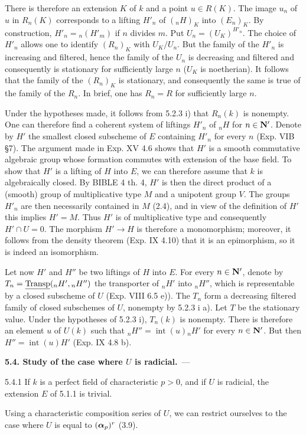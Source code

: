 There is therefore an extension $K$ of $k$ and a point $u\in R(K)$. The image $u_n$ of $u$ in $R_n(K)$ corresponds to a lifting $H'_n$ of $({}_nH)_K$ into $(E_n)_K$. By construction, $H'_n={}_n(H'_m)$ if $n$ divides $m$. Put $U_n=(U_K)^{H'_n}$. The choice of $H'_n$ allows one to identify $(R_n)_K$ with $U_K/U_n$. But the family of the $H'_n$ is increasing and filtered, hence the family of the $U_n$ is decreasing and filtered and consequently is stationary for sufficiently large $n$ ($U_K$ is noetherian). It follows that the family of the $(R_n)_K$ is stationary, and consequently the same is true of the family of the $R_n$. In brief, one has $R_n=R$ for sufficiently large $n$.

Under the hypotheses made, it follows from 5.2.3 i) that $R_n(k)$ is nonempty. One can therefore find a coherent system of liftings $H'_n$ of ${}_nH$ for $n\in\mathbf{N}'$. Denote by $H'$ the smallest closed subscheme of $E$ containing $H'_n$ for every $n$ (Exp. VIB \S7). The argument made in Exp. XV 4.6 shows that $H'$ is a smooth commutative algebraic group whose formation commutes with extension of the base field. To show that $H'$ is a lifting of $H$ into $E$, we can therefore assume that $k$ is algebraically closed. By BIBLE 4 th. 4, $H'$ is then the direct product of a (smooth) group of multiplicative type $M$ and a unipotent group $V$. The groups $H'_n$ are then necessarily contained in $M$ (2.4), and in view of the definition of $H'$ this implies $H'=M$. Thus $H'$ is of multiplicative type and consequently $H'\cap U=0$. The morphism $H'\to H$ is therefore a monomorphism; moreover, it follows from the density theorem (Exp. IX 4.10) that it is an epimorphism, so it is indeed an isomorphism.

Let now $H'$ and $H''$ be two liftings of $H$ into $E$. For every $n\in\mathbf{N}'$, denote by $T_n=\underline{\operatorname{Transp}}({}_nH',{}_nH'')$ the transporter of ${}_nH'$ into ${}_nH''$, which is representable by a closed subscheme of $U$ (Exp. VIII 6.5 e)). The $T_n$ form a decreasing filtered family of closed subschemes of $U$, nonempty by 5.2.3 i a). Let $T$ be the stationary value. Under the hypotheses of 5.2.3 i), $T_n(k)$ is nonempty. There is therefore an element $u$ of $U(k)$ such that ${}_nH''=\operatorname{int}(u){}_nH'$ for every $n\in\mathbf{N}'$. But then $H''=\operatorname{int}(u)H'$ (Exp. IX 4.8 b).

\par\medskip\noindent\begin{minipage}{\linewidth}
\noindent\textbf{5.4. Study of the case where $U$ is radicial.}\ ---\par\label{XVII.5.4}
\begin{proposition}{5.4.1}\label{XVII.5.4.1}
If $k$ is a perfect field of characteristic $p>0$, and if $U$ is radicial, the extension $E$ of 5.1.1 is trivial.
\end{proposition}
\end{minipage}\par
Using a characteristic composition series of $U$, we can restrict ourselves to the case where $U$ is equal to $(\boldsymbol{\alpha}_p)^r$ (3.9).

